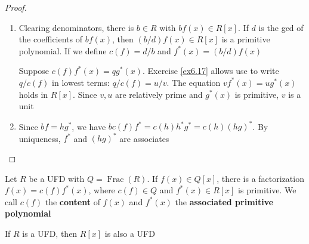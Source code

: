 \documentclass[11pt]{article}
\DeclareMathOperator{\Frac}{Frac}
\begin{document}
\begin{proof}
\begin{enumerate}
\item Clearing denominators, there is \(b\in R\) with \(bf(x)\in R[x]\). If
\(d\) is the gcd of the coefficients of \(bf(x)\), then \((b/d)f(x)\in
      R[x]\) is a primitive polynomial. If we define \(c(f)=d/b\) and 
\(f^*(x)=(b/d)f(x)\)

Suppose \(c(f)f^*(x)=qg^*(x)\). Exercise \ref{ex6.17} allows use to write
\(q/c(f)\) in lowest terms: \(q/c(f)=u/v\). The equation 
\(vf^*(x)=ug^*(x)\) holds in \(R[x]\). Since \(v,u\) are relatively prime
and \(g^*(x)\) is primitive, \(v\) is a unit

\setcounter{enumi}{3}
\item Since \(bf=hg^*\), we have \(bc(f)f^*=c(h)h^*g^*=c(h)(hg)^*\). By
uniqueness, \(f^*\) and \((hg)^*\) are associates
\end{enumerate}
\end{proof}

\begin{definition}[]
Let \(R\) be a UFD with \(Q=\Frac(R)\). If \(f(x)\in Q[x]\), there is a
factorization \(f(x)=c(f)f^*(x)\), where \(c(f)\in Q\) and 
\(f^*(x)\in R[x]\) is primitive. We call \(c(f)\) the \textbf{content} of \(f(x)\) and
\(f^*(x)\) the \textbf{associated primitive polynomial}
\end{definition}

\begin{theorem}[Gauss]
If \(R\) is a UFD, then \(R[x]\) is also a UFD
\end{theorem}
\end{document}

